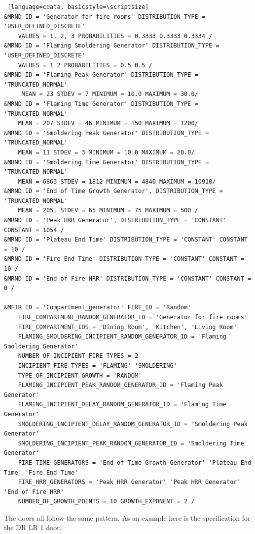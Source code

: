\documentclass[12pt,twoside]{book}
\begin{document}
\vspace{\baselineskip}
\begin{lstlisting} [language=cdata, basicstyle=\scriptsize]
&MRND ID = 'Generator for fire rooms' DISTRIBUTION_TYPE = 'USER_DEFINED_DISCRETE'
	VALUES = 1, 2, 3 PROBABILITIES = 0.3333 0.3333 0.3334 /
&MRND ID = 'Flaming Smoldering Generator' DISTRIBUTION_TYPE = 'USER_DEFINED_DISCRETE'
	VALUES = 1 2 PROBABILITIES = 0.5 0.5 /
&MRND ID = 'Flaming Peak Generator' DISTRIBUTION_TYPE = 'TRUNCATED_NORMAL'
	 MEAN = 23 STDEV = 7 MINIMUM = 10.0 MAXIMUM = 30.0/
&MRND ID = 'Flaming Time Generator' DISTRIBUTION_TYPE = 'TRUNCATED_NORMAL'
	MEAN = 207 STDEV = 46 MINIMUM = 150 MAXIMUM = 1200/
&MRND ID = 'Smoldering Peak Generator' DISTRIBUTION_TYPE = 'TRUNCATED_NORMAL'
	MEAN = 11 STDEV = 3 MINIMUM = 10.0 MAXIMUM = 20.0/
&MRND ID = 'Smoldering Time Generator' DISTRIBUTION_TYPE = 'TRUNCATED_NORMAL'
	MEAN = 6863 STDEV = 1812 MINIMUM = 4840 MAXIMUM = 10910/
&MRND ID = 'End of Time Growth Generator', DISTRIBUTION_TYPE = 'TRUNCATED_NORMAL'
	MEAN = 205, STDEV = 65 MINIMUM = 75 MAXIMUM = 500 /
&MRND ID = 'Peak HRR Generator', DISTRIBUTION_TYPE = 'CONSTANT' CONSTANT = 1054 /
&MRND ID = 'Plateau End Time' DISTRIBUTION_TYPE = 'CONSTANT' CONSTANT = 10 /
&MRND ID = 'Fire End Time' DISTRIBUTION_TYPE = 'CONSTANT' CONSTANT = 10 /
&MRND ID = 'End of Fire HRR' DISTRIBUTION_TYPE = 'CONSTANT' CONSTANT = 0 /

&MFIR ID = 'Compartment_generator' FIRE_ID = 'Random'
	FIRE_COMPARTMENT_RANDOM_GENERATOR_ID = 'Generator for fire rooms'
    FIRE_COMPARTMENT_IDS = 'Dining Room', 'Kitchen', 'Living Room'
    FLAMING_SMOLDERING_INCIPIENT_RANDOM_GENERATOR_ID = 'Flaming Smoldering Generator'
	NUMBER_OF_INCIPIENT_FIRE_TYPES = 2
    INCIPIENT_FIRE_TYPES = 'FLAMING' 'SMOLDERING'
	TYPE_OF_INCIPIENT_GROWTH = 'RANDOM'
	FLAMING_INCIPIENT_PEAK_RANDOM_GENERATOR_ID = 'Flaming Peak Generator'
    FLAMING_INCIPIENT_DELAY_RANDOM_GENERATOR_ID = 'Flaming Time Generator'
    SMOLDERING_INCIPIENT_DELAY_RANDOM_GENERATOR_ID = 'Smoldering Peak Generator'
    SMOLDERING_INCIPIENT_PEAK_RANDOM_GENERATOR_ID = 'Smoldering Time Generator'
	FIRE_TIME_GENERATORS = 'End of Time Growth Generator' 'Plateau End Time' 'Fire End Time'
	FIRE_HRR_GENERATORS = 'Peak HRR Generator' 'Peak HRR Generator' 'End of Fire HRR'
    NUMBER_OF_GROWTH_POINTS = 10 GROWTH_EXPONENT = 2 /
\end{lstlisting}

The doors all follow the same pattern. As an example here is the specification for the DR LR 1 door.
\end{document}
